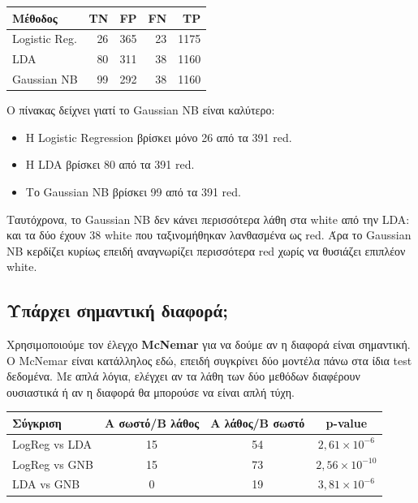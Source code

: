 \documentclass[11pt,a4paper]{article}
\begin{document}
\begin{center}
{\small
\begin{tabular}{lrrrr}
\toprule
Μέθοδος & TN & FP & FN & TP \\
\midrule
Logistic Reg. & 26 & 365 & 23 & 1175 \\
LDA & 80 & 311 & 38 & 1160 \\
Gaussian NB & 99 & 292 & 38 & 1160 \\
\bottomrule
\end{tabular}
}
\end{center}

Ο πίνακας δείχνει γιατί το Gaussian NB είναι καλύτερο:
\begin{itemize}
    \item Η Logistic Regression βρίσκει μόνο 26 από τα 391 red.
    \item Η LDA βρίσκει 80 από τα 391 red.
    \item Το Gaussian NB βρίσκει 99 από τα 391 red.
\end{itemize}

Ταυτόχρονα, το Gaussian NB δεν κάνει περισσότερα λάθη στα white από την LDA:
και τα δύο έχουν 38 white που ταξινομήθηκαν λανθασμένα ως red. Άρα το
Gaussian NB κερδίζει κυρίως επειδή αναγνωρίζει περισσότερα red χωρίς να
θυσιάζει επιπλέον white.

\subsection{Υπάρχει σημαντική διαφορά;}

Χρησιμοποιούμε τον έλεγχο \textbf{McNemar} για να δούμε αν η διαφορά είναι
σημαντική. Ο McNemar είναι κατάλληλος εδώ, επειδή συγκρίνει δύο μοντέλα πάνω
στα ίδια test δεδομένα. Με απλά λόγια, ελέγχει αν τα λάθη των δύο μεθόδων
διαφέρουν ουσιαστικά ή αν η διαφορά θα μπορούσε να είναι απλή τύχη.

\begin{center}
{\small
\begin{tabular}{lccc}
\toprule
Σύγκριση & A σωστό/B λάθος & A λάθος/B σωστό & p-value \\
\midrule
LogReg vs LDA & 15 & 54 & \(2{,}61 \times 10^{-6}\) \\
LogReg vs GNB & 15 & 73 & \(2{,}56 \times 10^{-10}\) \\
LDA vs GNB & 0 & 19 & \(3{,}81 \times 10^{-6}\) \\
\bottomrule
\end{tabular}
}
\end{center}
\end{document}
